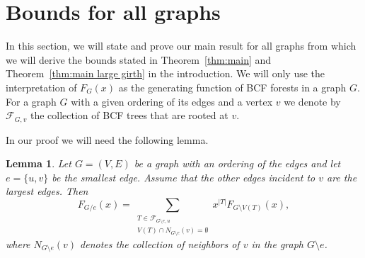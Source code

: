 \documentclass[a4paper,11pt,reqno]{amsart}
\newtheorem{lemma}[corollary]{Lemma}
\numberwithin{equation}{section}
\begin{document}
\section{Bounds for all graphs}\label{sec:general}
In this section, we will state and prove our main result for all graphs from which we will derive the bounds stated in Theorem~\ref{thm:main} and Theorem~\ref{thm:main large girth} in the introduction.
We will only use the interpretation of $F_G(x)$ as the generating function of BCF forests in a graph $G$.
For a graph $G$ with a given ordering of its edges and a  vertex $v$ we denote by $\mathcal{F}_{G,v}$ the collection of BCF trees that are rooted at $v$.

In our proof we will need the following lemma.

\begin{lemma}\label{lem:expand G/e}
Let $G=(V,E)$ be a graph with an ordering of the edges and let $e=\{u,v\}$ be the smallest edge. Assume that the other edges incident to $v$ are the largest edges.   
Then
\begin{equation}\label{eq:contraction recurrence}
F_{G/e}(x)=\sum_{\substack{T\in \mathcal{F}_{G\setminus e,u}\\ V(T)\cap N_{G\setminus e}(v)=\emptyset}}x^{|T|}F_{G\setminus V(T)}(x),    
\end{equation}
where $N_{G\setminus e}(v)$ denotes the collection of neighbors of $v$ in the graph $G\setminus e$.
\end{lemma}
\end{document}
